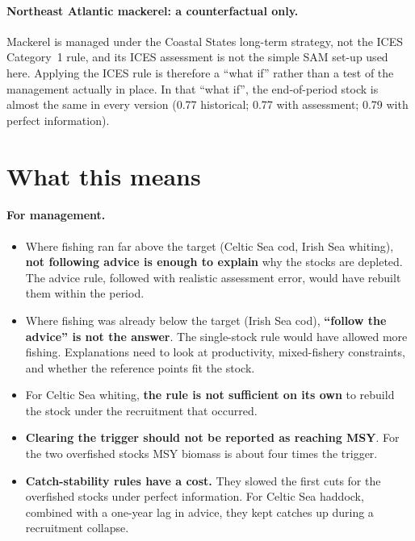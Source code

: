 \documentclass[11pt,a4paper]{article}
\begin{document}
\paragraph{Northeast Atlantic mackerel: a counterfactual only.} Mackerel is
managed under the Coastal States long-term strategy, not the ICES
Category~1 rule, and its ICES assessment is not the simple SAM set-up used
here. Applying the ICES rule is therefore a ``what if'' rather than a test
of the management actually in place. In that ``what if'', the end-of-period
stock is almost the same in every version (0.77 historical; 0.77 with
assessment; 0.79 with perfect information).

\section{What this means}
\label{sec:meaning}

\paragraph{For management.}
\begin{itemize}
\item Where fishing ran far above the target (Celtic Sea cod, Irish Sea
whiting), \textbf{not following advice is enough to explain} why the stocks
are depleted. The advice rule, followed with realistic assessment error,
would have rebuilt them within the period.
\item Where fishing was already below the target (Irish Sea cod),
\textbf{``follow the advice'' is not the answer}. The single-stock rule would
have allowed more fishing. Explanations need to look at productivity,
mixed-fishery constraints, and whether the reference points fit the stock.
\item For Celtic Sea whiting, \textbf{the rule is not sufficient on its own}
to rebuild the stock under the recruitment that occurred.
\item \textbf{Clearing the trigger should not be reported as reaching MSY}.
For the two overfished stocks MSY biomass is about four times the trigger.
\item \textbf{Catch-stability rules have a cost.} They slowed the first cuts
for the overfished stocks under perfect information. For Celtic Sea
haddock, combined with a one-year lag in advice, they kept catches up during
a recruitment collapse.
\end{itemize}
\end{document}
